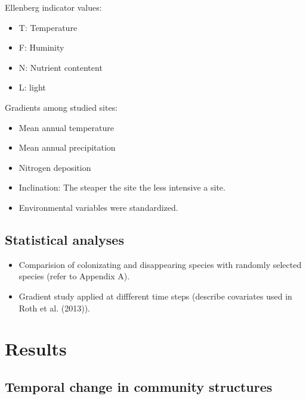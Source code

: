 \documentclass[fleqn,10pt,lineno]{wlpeerj} %
\providecommand{\tightlist}{
\setlength{\itemsep}{0pt}\setlength{\parskip}{0pt}}
\theoremstyle{definition}
\theoremstyle{definition}
\theoremstyle{definition}
\theoremstyle{remark}
\begin{document}
Ellenberg indicator values:

\begin{itemize}
\tightlist
\item
  T: Temperature
\item
  F: Huminity
\item
  N: Nutrient contentent
\item
  L: light
\end{itemize}

Gradients among studied sites:

\begin{itemize}
\tightlist
\item
  Mean annual temperature
\item
  Mean annual precipitation
\item
  Nitrogen deposition
\item
  Inclination: The steaper the site the less intensive a site.
\item
  Environmental variables were standardized.
\end{itemize}

\subsection*{Statistical analyses}\label{statistical-analyses}

\begin{itemize}
\tightlist
\item
  Comparision of colonizating and disappearing species with randomly
  selected species (refer to Appendix A).
\item
  Gradient study applied at diffferent time steps (describe covariates
  used in Roth et al. (2013)).
\end{itemize}

\section*{Results}\label{results}

\subsection*{Temporal change in community
structures}\label{temporal-change-in-community-structures}
\end{document}
